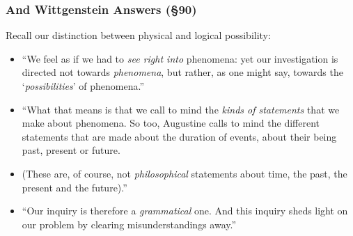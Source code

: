 \begin{frame}
\frametitle{And Wittgenstein Answers (\S 90)}

Recall our distinction between physical and logical possibility:

\begin{itemize}[<+->]

\item ``We feel as if we had to \textit{see right into} phenomena: yet our investigation is directed not towards \textit{phenomena}, but rather, as one might say, towards the `\textit{possibilities}' of phenomena.''

\item ``What that means is that we call to mind the \textit{kinds of statements} that we make about phenomena. So too, Augustine calls to mind the different statements that are made about the duration of events, about their being past, present or future. 
\item[] (These are, of course, not \textit{philosophical} statements about time, the past, the present and the future).''

\item ``Our inquiry is therefore a \emph{grammatical} one. And this inquiry sheds light on our problem by clearing misunderstandings away.''

\end{itemize}
\end{frame}

\iffalse

